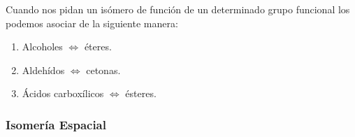 \begin{enumerate}[label=\numberballmDarkTeal]

    Cuando nos pidan un isómero de función de un determinado grupo funcional los podemos asociar de la siguiente manera:

    \begin{enumerate}
        \item Alcoholes \(\iff\) éteres.
        \item Aldehídos \(\iff\) cetonas.
        \item Ácidos carboxílicos \(\iff\) ésteres.
    \end{enumerate}
\end{enumerate}


\subsubsection{Isomería Espacial}

